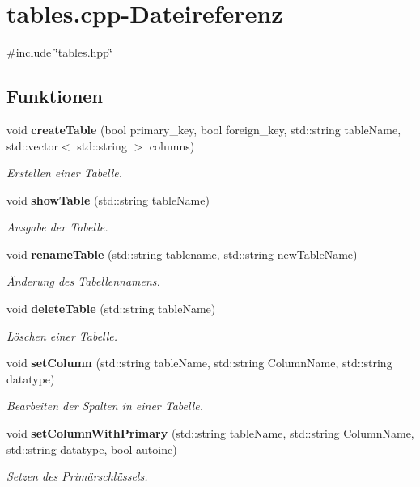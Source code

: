 \section{tables.\+cpp-\/\+Dateireferenz}
\label{tables_8cpp}
{\ttfamily \#include \char`\"{}tables.\+hpp\char`\"{}}\newline
\subsection*{Funktionen}
\begin{DoxyCompactItemize}
\item 
void \textbf{ create\+Table} (bool primary\+\_\+key, bool foreign\+\_\+key, std\+::string table\+Name, std\+::vector$<$ std\+::string $>$ columns)
\begin{DoxyCompactList}\small\item\em Erstellen einer Tabelle. \end{DoxyCompactList}\item 
void \textbf{ show\+Table} (std\+::string table\+Name)
\begin{DoxyCompactList}\small\item\em Ausgabe der Tabelle. \end{DoxyCompactList}\item 
void \textbf{ rename\+Table} (std\+::string tablename, std\+::string new\+Table\+Name)
\begin{DoxyCompactList}\small\item\em Änderung des Tabellennamens. \end{DoxyCompactList}\item 
void \textbf{ delete\+Table} (std\+::string table\+Name)
\begin{DoxyCompactList}\small\item\em Löschen einer Tabelle. \end{DoxyCompactList}\item 
void \textbf{ set\+Column} (std\+::string table\+Name, std\+::string Column\+Name, std\+::string datatype)
\begin{DoxyCompactList}\small\item\em Bearbeiten der Spalten in einer Tabelle. \end{DoxyCompactList}\item 
void \textbf{ set\+Column\+With\+Primary} (std\+::string table\+Name, std\+::string Column\+Name, std\+::string datatype, bool autoinc)
\begin{DoxyCompactList}\small\item\em Setzen des Primärschlüssels. \end{DoxyCompactList}\item 

\end{DoxyCompactItemize}

